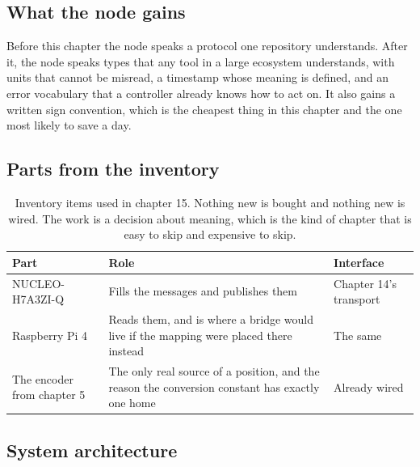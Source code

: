 \subsection*{What the node gains}

Before this chapter the node speaks a protocol one repository understands. After
it, the node speaks types that any tool in a large ecosystem understands, with
units that cannot be misread, a timestamp whose meaning is defined, and an error
vocabulary that a controller already knows how to act on. It also gains a
written sign convention, which is the cheapest thing in this chapter and the one
most likely to save a day.

\subsection*{Parts from the inventory}

\begin{table}[H]\centering\small
\begin{tabular}{p{40mm}p{66mm}p{40mm}}
\toprule
Part & Role & Interface \\
\midrule
NUCLEO-H7A3ZI-Q & Fills the messages and publishes them & Chapter 14's transport \\
Raspberry Pi 4 & Reads them, and is where a bridge would live if the mapping were
placed there instead & The same \\
The encoder from chapter 5 & The only real source of a position, and the reason
the conversion constant has exactly one home & Already wired \\
\bottomrule
\end{tabular}
\caption{Inventory items used in chapter 15. Nothing new is bought and nothing new is wired. The work is a decision about meaning, which is the kind of chapter that is easy to skip and expensive to skip.}
\end{table}

\subsection*{System architecture}


